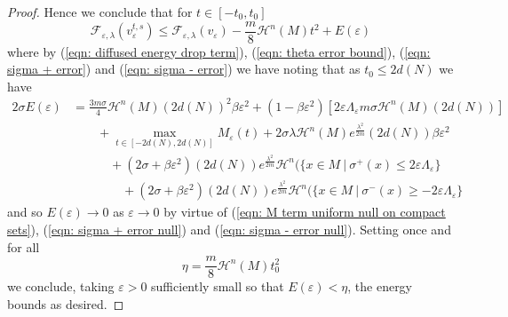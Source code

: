 \documentclass[11pt]{article}
\begin{document}
\begin{proof}
Hence we conclude that for $t \in [-t_0,t_0]$
\begin{equation*}
    \mathcal{F}_{\varepsilon,\lambda}(v^{t,s}_\varepsilon) \leq \mathcal{F}_{\varepsilon,\lambda}(v_\varepsilon) - \frac{m}{8}\mathcal{H}^n(M)t^2 + E(\varepsilon)
\end{equation*}
where by (\ref{eqn: diffused energy drop term}), (\ref{eqn: theta error bound}), (\ref{eqn: sigma + error}) and (\ref{eqn: sigma - error}) we have noting that as $t_0 \leq 2d(N)$ we have
\begin{align*}
    2\sigma E(\varepsilon) &=  \frac{3m\sigma}{4}\mathcal{H}^n(M)(2d(N))^2\beta\varepsilon^2 + (1 - \beta \varepsilon^2)\left[ 2\varepsilon\Lambda_\varepsilon m\sigma\mathcal{H}^n(M)(2d(N))\right]\\
    &\quad\quad+ \max_{t \in [-2d(N),2d(N)]} M_\varepsilon(t) +  2\sigma\lambda\mathcal{H}^n(M)e^\frac{\lambda^2}{2m}(2d(N)) \beta \varepsilon^2\\
    &\quad\quad\quad+ (2\sigma + \beta \varepsilon^2) (2d(N)) e^\frac{\lambda^2}{2m}\mathcal{H}^n(\{ x \in M \: | \: \sigma^+(x) \leq 2\varepsilon\Lambda_\varepsilon \}\\
    &\quad\quad\quad\quad+ (2\sigma + \beta \varepsilon^2) (2d(N)) e^\frac{\lambda^2}{2m}\mathcal{H}^n(\{ x \in M \: | \: \sigma^-(x) \geq -2\varepsilon\Lambda_\varepsilon \}
\end{align*}
and so $E(\varepsilon) \rightarrow 0$ as $\varepsilon \rightarrow 0$ by virtue of (\ref{eqn: M term uniform null on compact sets}), (\ref{eqn: sigma + error null}) and (\ref{eqn: sigma - error null}). Setting once and for all 
\begin{equation*}
    \eta = \frac{m}{8}\mathcal{H}^n(M)t_0^2
\end{equation*}
we conclude, taking $\varepsilon > 0$ sufficiently small so that $E(\varepsilon) < \eta$, the energy bounds as desired.
\end{proof}
\end{document}
